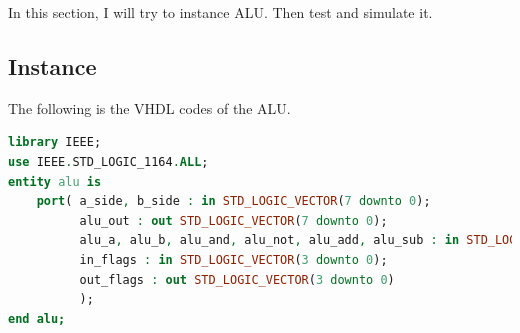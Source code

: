 \documentclass{article}
\begin{document}
In this section, I will try to instance ALU. Then test and simulate it.

\subsection{Instance}
\label{sec:alu:instance}

The following is the VHDL codes of the ALU.

\begin{lstlisting}[language=VHDL]
library IEEE;
use IEEE.STD_LOGIC_1164.ALL;
entity alu is
    port( a_side, b_side : in STD_LOGIC_VECTOR(7 downto 0);
          alu_out : out STD_LOGIC_VECTOR(7 downto 0);
          alu_a, alu_b, alu_and, alu_not, alu_add, alu_sub : in STD_LOGIC;
          in_flags : in STD_LOGIC_VECTOR(3 downto 0);
          out_flags : out STD_LOGIC_VECTOR(3 downto 0)
          );
end alu;


\end{lstlisting}
\end{document}
